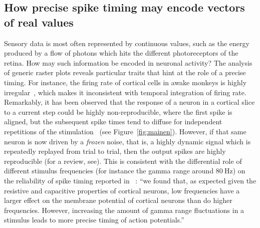 \documentclass[brainsci, %
               review,submit,pdftex,moreauthors
               ]{Definitions/mdpi}
\begin{document}
\subsection{How precise spike timing may encode vectors of real values}
Sensory data is most often represented by continuous values, such as the energy produced by a flow of photons which hits the different photoreceptors of the retina. How may such information be encoded in neuronal activity? The analysis of generic raster plots reveals particular traits that hint at the role of a precise timing. For instance, the firing rate of cortical cells in awake monkeys is highly irregular~\citep{softky_highly_1993}, which makes it inconsistent with temporal integration of firing rate. Remarkably, it has been observed that the response of a neuron in a cortical slice to a current step could be highly non-reproducible, where the first spike is aligned, but the subsequent spike times tend to diffuse for independent repetitions of the stimulation~\citep{mainen_reliability_1995} (see Figure~\ref{fig:mainen}). However, if that same neuron is now driven by a \emph{frozen} noise, that is, a highly dynamic signal which is repeatedly replayed from trial to trial, then the output spikes are highly reproducible (for a review, see\citep{ermentrout_reliability_2008}). This is consistent with the differential role of different stimulus frequencies (for instance the gamma range around $80~\si{\Hz}$) on the reliability of spike timing reported in~\citep{nowak_influence_1997} : ``we found that, as expected given the resistive and capacitive properties of cortical neurons, low frequencies have a larger effect on the membrane potential of cortical neurons than do higher frequencies. However, increasing the amount of gamma range fluctuations in a stimulus leads to more precise timing of action potentials.'' 
\end{document}
